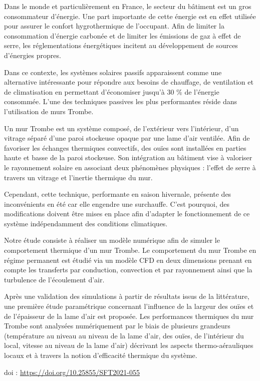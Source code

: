 {\normalsize
Dans le monde et particulièrement en France, le secteur du bâtiment est un gros consommateur d'énergie. Une part importante de cette énergie est en effet utilisée pour assurer le confort hygrothermique de l'occupant. Afin de limiter la consommation d'énergie carbonée et de limiter les émissions de gaz à effet de serre, les réglementations énergétiques incitent au développement de  sources d'énergies propres.







Dans ce contexte, les systèmes solaires passifs apparaissent comme une alternative intéressante pour répondre aux besoins de chauffage, de ventilation et de climatisation en permettant d'économiser jusqu'à 30 \% de l'énergie consommée. L'une des techniques passives les plus performantes réside dans l'utilisation de murs Trombe. 







Un mur Trombe est un système composé, de l'extérieur vers l'intérieur, d'un vitrage séparé d'une paroi stockeuse opaque par une lame d'air ventilée. Afin de favoriser les échanges thermiques convectifs, des ouïes sont installées en parties haute et basse de la paroi stockeuse. Son intégration au bâtiment vise à valoriser le rayonnement solaire en associant deux phénomènes physiques : l'effet de serre à travers un vitrage et l'inertie thermique du mur. 







Cependant, cette technique, performante en saison hivernale, présente des inconvénients en été car elle engendre une surchauffe. C'est pourquoi, des modifications doivent être mises en place afin d'adapter le fonctionnement de ce système indépendamment des conditions climatiques. 







Notre étude consiste à réaliser un modèle numérique afin de simuler le comportement thermique d'un mur Trombe. Le comportement du mur Trombe en régime permanent est étudié via un modèle CFD en deux dimensions prenant en compte les transferts par conduction, convection et par rayonnement ainsi que la turbulence de l'écoulement d'air. 







Après une validation des simulations à partir de résultats issus de la littérature, une première étude paramétrique concernant l'influence de la largeur des ouïes et de l'épaisseur de la lame d'air est proposée. Les performances thermiques du mur Trombe sont analysées numériquement par le biais de plusieurs grandeurs (température au niveau au niveau de la lame d'air, des ouïes, de l'intérieur du local, vitesse au niveau de la lame d'air) décrivant les aspects thermo-aérauliques locaux et à travers la notion d'efficacité thermique du système.

 \vfill doi : \url{https://doi.org/10.25855/SFT2021-055}

}
 
